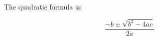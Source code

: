 \documentclass{article}
\begin{document}
The quadratic formula is: 

\[ \frac{-b \pm \sqrt{b^2 - 4ac}}{2a} \]
\end{document}
